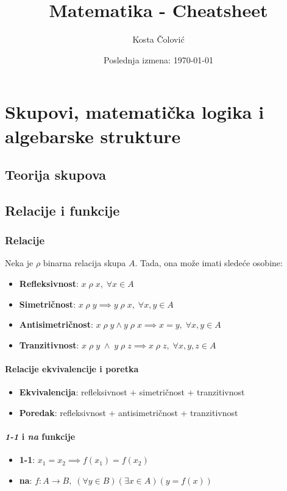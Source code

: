 \documentclass[a4paper,12pt,twoside]{report}
\title{Matematika - Cheatsheet}
\author{Kosta Čolović}
\date{Poslednja izmena: \today}
\numberwithin{algorithm}{section}
\begin{document}
\maketitle
\setcounter{page}{2}
\tableofcontents
\newpage

\part{Skupovi, matematička logika i algebarske strukture}


\chapter{Teorija skupova}

\chapter{Relacije i funkcije}
\section{Relacije}
Neka je $\rho$ binarna relacija skupa $A$. Tada, ona može imati sledeće osobine:\\
\begin{itemize}
    \item \textbf{Refleksivnost}: $x \; \rho \; x, \;\forall x \in A$\\
    \item \textbf{Simetričnost}: $x \; \rho \; y \implies y \; \rho \; x, \;\forall x,y \in A$\\
    \item \textbf{Antisimetričnost}: $x \; \rho \; y \land y \; \rho \; x \implies x = y, \;\forall x,y \in A$\\
    \item \textbf{Tranzitivnost}: $x \;\rho\; y \;\land \; y \;\rho\; z \implies x \;\rho \; z, \; \forall x,y,z \in A$
\end{itemize}
\subsection{Relacije ekvivalencije i poretka}
\begin{itemize}
    \item \textbf{Ekvivalencija}: refleksivnost + simetričnost + tranzitivnost
    \item \textbf{Poredak}: refleksivnost + antisimetričnost + tranzitivnost
\end{itemize}
\subsection{\textit{1-1} i \textit{na} funkcije}
\begin{itemize}
    \item \textbf{1-1}: $x_1=x_2 \implies f(x_1) = f(x_2)$
    \item \textbf{na}: $f:A\xrightarrow{} B, \; (\forall y \in B)(\exists x \in A)(y = f(x))$
\end{itemize}
\end{document}
